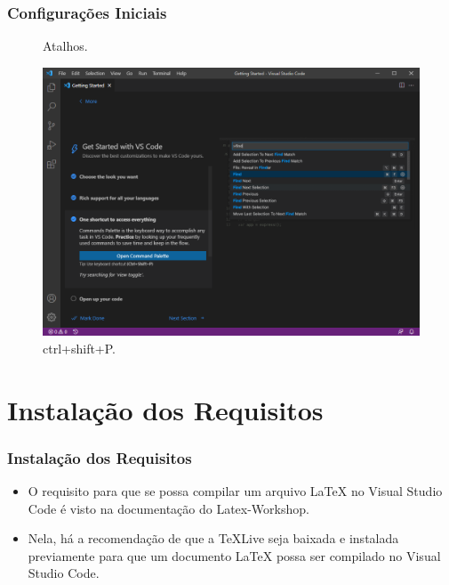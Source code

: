 \documentclass[brazilian]{beamer}
\begin{document}
\begin{frame}
    \frametitle{Configurações Iniciais}
    \begin{figure}[h]
        \centering
        \caption{Atalhos.}
        \label{fig:atalhos}
        \includegraphics[width=0.8\textheight]{../images/atalhos.png}
        \caption*{\footnotesize ctrl+shift+P.}
    \end{figure}
\end{frame}

\section{Instalação dos Requisitos}

\begin{frame}
    \frametitle{Instalação dos Requisitos}
    \begin{itemize}
        \item O requisito para que se possa compilar um arquivo LaTeX no Visual Studio Code é visto na documentação do Latex-Workshop.
        \item Nela, há a recomendação de que a TeXLive seja baixada e instalada previamente para que um documento LaTeX possa ser compilado no Visual Studio Code.
    \end{itemize}
\end{frame}
\end{document}
